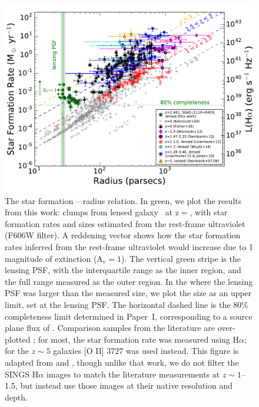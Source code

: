 \begin{figure}
\includegraphics[width=6.5in,angle=0]{f2.pdf} %
\caption{The star formation -- radius relation.  
In green, we plot the results from this work:
clumps from lensed galaxy  \arcnamelong\ at z$=$\zA,  
with star formation rates and sizes estimated 
from the rest-frame ultraviolet (F606W filter).  A reddening vector shows how the 
star formation rates inferred from the rest-frame ultraviolet would increase 
due to 1 magnitude of extinction (A$_v=1$).
The vertical green stripe is the lensing PSF, with the interquartile range 
as the inner region, and the full range measured as the outer region. 
In the  
where the lensing PSF was larger than the measured size,
we plot the size as an upper limit, set at the lensing PSF. 
The horizontal dashed line is the $80\%$ completeness limit determined
in Paper~I, corresponding to a source plane flux of \fluxcompleteness.
Comparison samples from the literature are over-plotted 
\citep{Swinbank:2007er, Swinbank:2009bb, Jones:2010hp, Wisnioski:2012cba, 
Livermore:2012gw, Swinbank:2012gs, Wuyts:2014eu, Livermore:2015ck, Fisher:2016jp}; 
for most,   the star formation rate was measured using H$\alpha$; 
for the $z\sim5$ galaxies [O II] 3727 was used instead.  
This figure is adapted from \citet{Livermore:2012gw} and \citet{Livermore:2015ck}, 
though unlike that work, we do not filter the SINGS H$\alpha$ images 
\citep{Kennicutt:2003jt} to 
match the literature measurements at $z\sim1$--1.5, but instead
use those images at their native resolution and depth.
}
\label{fig:surfacedensity}
\end{figure}


